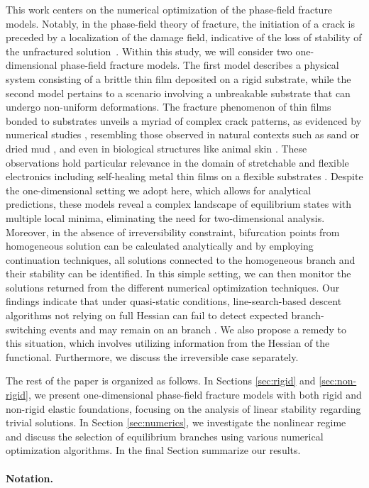 This work centers on the numerical optimization of the  phase-field fracture models.  Notably, in the phase-field theory of fracture, the initiation of a crack is preceded by a localization of the damage field, indicative of the loss of stability of the unfractured solution~\cite{Baldelli2014-ho,Kuhn2015-rt,Baldelli2021-gc,Harandi2023-cd}. Within this study, we will consider two one-dimensional phase-field  fracture models. The first model describes a physical system consisting of a brittle thin film deposited on a rigid substrate,  while the second model pertains to a scenario involving a  unbreakable substrate that can undergo non-uniform deformations.  The fracture phenomenon of thin films bonded to substrates unveils a myriad of complex crack patterns, as evidenced by numerical studies \cite{Baldelli2014-ho,Alessi2019-bx,Hu2020-nt,Salman2021-mn,Baldelli2021-gc}, resembling those observed in natural contexts such as sand or dried mud \cite{Goehring2010-xz}, and even in biological structures like animal skin \cite{Qin2014-wz}. These observations hold particular relevance in the domain of stretchable and flexible electronics \cite{Faurie2019-to,Godard2022-ss} including  self-healing metal thin films on a flexible substrates \cite{Trost2024-ca}.  Despite the one-dimensional setting we adopt here, which allows for analytical predictions, these models reveal a complex landscape of equilibrium states with multiple local minima, eliminating the need for two-dimensional analysis. Moreover, in the absence of irreversibility constraint, bifurcation points from homogeneous solution can be calculated analytically and by employing continuation techniques, all solutions connected to the homogeneous branch and their stability can be identified. 
In this simple setting, we can then monitor the solutions returned from  the different  numerical optimization techniques. Our findings indicate that under quasi-static conditions, line-search-based descent algorithms not relying on full Hessian can fail to detect expected branch-switching events and may remain on an  branch . 
We also propose a remedy to this situation, which involves utilizing information from the Hessian of the functional. Furthermore, we discuss the irreversible case separately.

The rest of the paper is organized as follows. In Sections \ref{sec:rigid} and \ref{sec:non-rigid}, we present one-dimensional phase-field fracture models with both rigid and non-rigid elastic foundations, focusing on the analysis  of linear stability regarding trivial solutions. In Section \ref{sec:numerics}, we investigate the nonlinear regime and discuss the selection of equilibrium branches using various numerical optimization algorithms. In the final Section  summarize our results.

\paragraph{Notation.} 
